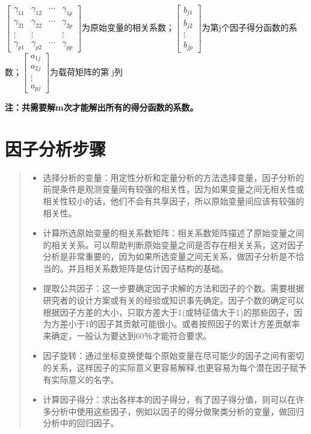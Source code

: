 \documentclass[]{ctexbook}
\providecommand{\tightlist}{%
  \setlength{\itemsep}{0pt}\setlength{\parskip}{0pt}}
\begin{document}
\(\begin {bmatrix}\gamma_{11}&\gamma_{12}&\cdots&\gamma_{1p}\\\gamma_{21}&\gamma_{22}&\cdots&\gamma_{2p}\\\vdots&\vdots&&\vdots\\\gamma_{p1}&\gamma_{p2}&\cdots&\gamma_{pp} \end {bmatrix}\)为原始变量的相关系数；\(\begin {bmatrix}b_{j1}\\b_{j2}\\\vdots\\b_{jp} \end {bmatrix}\)为第j个因子得分函数的系数；\(\begin {bmatrix}a_{1j}\\a_{2j}\\\vdots\\a_{pj} \end {bmatrix}\)为载荷矩阵的第 j列

\textbf{注：共需要解m次才能解出所有的得分函数的系数。}

\hypertarget{ux56e0ux5b50ux5206ux6790ux6b65ux9aa4}{%
\section{因子分析步骤}\label{ux56e0ux5b50ux5206ux6790ux6b65ux9aa4}}

\begin{quote}
\begin{itemize}
\tightlist
\item
  选择分析的变量：用定性分析和定量分析的方法选择变量，因子分析的前提条件是观测变量间有较强的相关性，因为如果变量之间无相关性或相关性较小的话，他们不会有共享因子，所以原始变量间应该有较强的相关性。
\item
  计算所选原始变量的相关系数矩阵：相关系数矩阵描述了原始变量之间的相关关系。可以帮助判断原始变量之间是否存在相关关系，这对因子分析是非常重要的，因为如果所选变量之间无关系，做因子分析是不恰当的。并且相关系数矩阵是估计因子结构的基础。
\item
  提取公共因子：这一步要确定因子求解的方法和因子的个数。需要根据研究者的设计方案或有关的经验或知识事先确定。因子个数的确定可以根据因子方差的大小，只取方差大于1(或特征值大于1)的那些因子，因为方差小于1的因子其贡献可能很小。或者按照因子的累计方差贡献率来确定，一般认为要达到60％才能符合要求。
\item
  因子旋转：通过坐标变换使每个原始变量在尽可能少的因子之间有密切的关系，这样因子的实际意义更容易解释,也更容易为每个潜在因子赋予有实际意义的名字。
\item
  计算因子得分：求出各样本的因子得分，有了因子得分值，则可以在许多分析中使用这些因子，例如以因子的得分做聚类分析的变量，做回归分析中的回归因子。
\end{itemize}
\end{quote}
\end{document}
